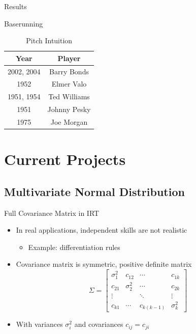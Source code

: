 \documentclass{beamer}
\theoremstyle{definition}
\begin{document}
\begin{frame}{Results}
\begin{multicols}{2}
\begin{table}[]
        \caption{Baserunning}
        \label{tab:baserun}
    \end{table}
    \vspace{-5em} %
    \begin{table}[]
        \centering
        \begin{tabular}{cc}
            Year & Player \\
            \hline
2002, 2004 & Barry Bonds \\
1952 & Elmer Valo \\ 
1951, 1954 & Ted Williams \\
1951 & Johnny Pesky \\
1975 & Joe Morgan
        \end{tabular}
        \caption{Pitch Intuition}
        \label{tab:pitch}
    \end{table}
\end{multicols}
\end{frame}

\section{Current Projects}

\subsection{Multivariate Normal Distribution}

\begin{frame}{Full Covariance Matrix in IRT}
\begin{itemize}
  \item In real applications, independent skills are not realistic
  \begin{itemize}
    \item Example: differentiation rules
  \end{itemize}
  \item<2-> Covariance matrix is symmetric, positive definite matrix
  \[\Sigma = \begin{bmatrix}
  \sigma_1^2 & c_{12} & \cdots & c_{1k} \\
  c_{21} & \sigma_2^2 & \cdots & c_{2k} \\
  \vdots & & \ddots & \vdots \\
  c_{k1} & \cdots & c_{k(k-1)} & \sigma_k^2
  \end{bmatrix}\]
  \item<2-> With variances $\sigma_i^2$ and covariances $c_{ij} = c_{ji}$
\end{itemize}
\end{frame}
\end{document}
